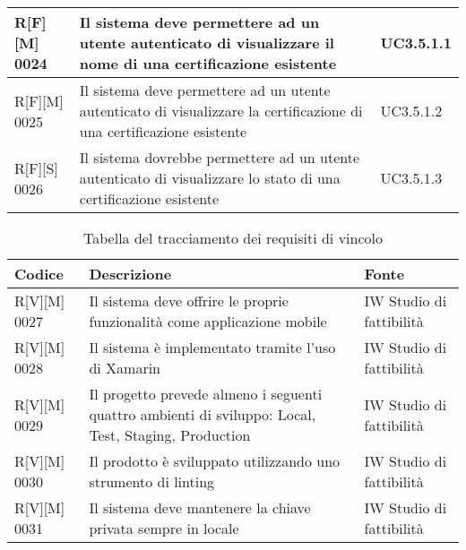 \begin{center}
\begin{longtable}{|p{2cm}|p{9cm}|p{2cm}|}
\hline
R[F][M] 0024     & Il sistema deve permettere ad un utente autenticato di visualizzare il nome di una certificazione esistente & UC3.5.1.1 \\
\hline
R[F][M] 0025     & Il sistema deve permettere ad un utente autenticato di visualizzare la certificazione di una certificazione esistente & UC3.5.1.2 \\
\hline
R[F][S] 0026     & Il sistema dovrebbe permettere ad un utente autenticato di visualizzare lo stato di una certificazione esistente & UC3.5.1.3 \\
\hline
\end{longtable}%
\end{center}


\begin{center}
\begin{longtable}{|p{2cm}|p{9cm}|p{2cm}|}%
\caption{Tabella del tracciamento dei requisiti di vincolo}
\label{tab:requisiti-vincolo}
\endfirsthead
\endhead
\hline
\textbf{Codice} & \textbf{Descrizione} & \textbf{Fonte}\\
\hline
R[V][M] 0027    & Il sistema deve offrire le proprie funzionalità come applicazione mobile &  IW Studio di fattibilità \\
\hline
R[V][M] 0028    & Il sistema è implementato tramite l’uso di Xamarin & IW Studio di fattibilità \\
\hline
R[V][M] 0029    & Il progetto prevede almeno i seguenti quattro ambienti di sviluppo: Local, Test, Staging, Production & IW Studio di fattibilità \\
\hline
R[V][M] 0030    & Il prodotto è sviluppato utilizzando uno strumento di linting & IW Studio di fattibilità \\
\hline
R[V][M] 0031    & Il sistema deve mantenere la chiave privata sempre in locale & IW Studio di fattibilità \\
\hline
\end{longtable}
\end{center}%



